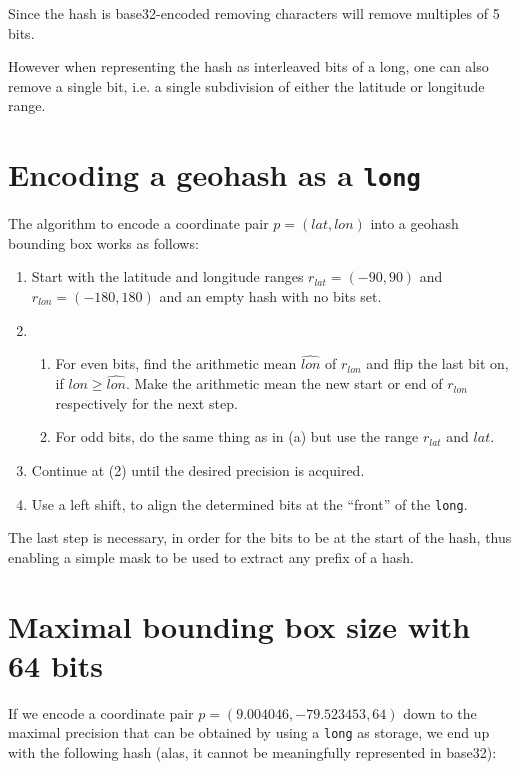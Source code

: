 \documentclass[a4paper,11pt,twoside]{scrartcl}
\begin{document}
Since the hash is base32-encoded removing characters will remove multiples of 5 bits.

However when representing the hash as interleaved bits of a long, one can also remove a single bit, i.e. a single subdivision of either the latitude or longitude range.

\section{Encoding a geohash as a \texttt{long}} %
\label{sec:encoding_a_geohash_as_a_}
The algorithm to encode a coordinate pair $p = (lat,lon)$ into a geohash bounding box works as follows:

\begin{enumerate}
	\item Start with the latitude and longitude ranges $r_{lat} = (-90,90)$ and $r_{lon} = (-180,180)$ and an empty hash with no bits set.
	\item \begin{enumerate}
		\item For even bits, find the arithmetic mean $\hat{lon}$ of $r_{lon}$ and flip the last bit on, if $lon \geq \hat{lon}$. Make the arithmetic mean the new start or end of $r_{lon}$ respectively for the next step.
		\item For odd bits, do the same thing as in (a) but use the range $r_{lat}$ and $lat$.
	\end{enumerate}
	\item Continue at (2) until the desired precision is acquired.
	\item Use a left shift, to align the determined bits at the “front” of the \texttt{long}.
\end{enumerate}

The last step is necessary, in order for the bits to be at the start of the hash, thus enabling a simple mask to be used to extract any prefix of a hash.


\section{Maximal bounding box size with 64 bits} %
\label{sec:maximal_precision_with_64_bits}
If we encode a coordinate pair $p = (9.004046, -79.523453, 64)$ down to the maximal precision that can be obtained by using a \texttt{long} as storage, we end up with the following hash (alas, it cannot be meaningfully represented in base32):
\end{document}
